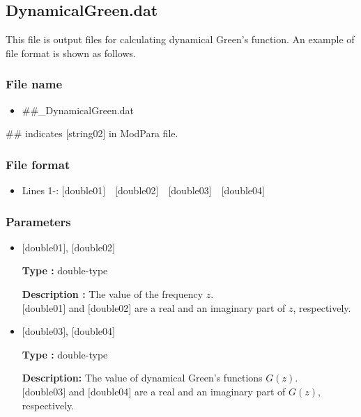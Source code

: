 \newpage
\subsection{{DynamicalGreen.dat}}
\label{Subsec:dynamicalG}
This file is output files for calculating dynamical Green's function. An example of file format is shown as follows.

\subsubsection{File name}
\begin{itemize}
   \item{\#\#\_DynamicalGreen.dat}
\end{itemize}
\#\# indicates [string02] in ModPara file.
  
\subsubsection{File format}
 \begin{itemize}
   \item  Lines 1-: $[$double01$]$~~$[$double02$]$~~$[$double03$]$~~$[$double04$]$
  \end{itemize}
  
\subsubsection{Parameters}
 \begin{itemize}

 \item  $[$double01$]$, $[$double02$]$

 {\bf Type :} double-type

 {\bf Description :} The value of the frequency $z$.\\
$[$double01$]$ and $[$double02$]$ are a real and an imaginary part of $z$, respectively.\\

 \item  $[$double03$]$, $[$double04$]$

 {\bf Type :} double-type 

 {\bf Description:} The value of dynamical Green's functions $G(z)$.\\
$[$double03$]$ and $[$double04$]$ are a real and an imaginary part of $G(z)$, respectively.\\

\end{itemize}



